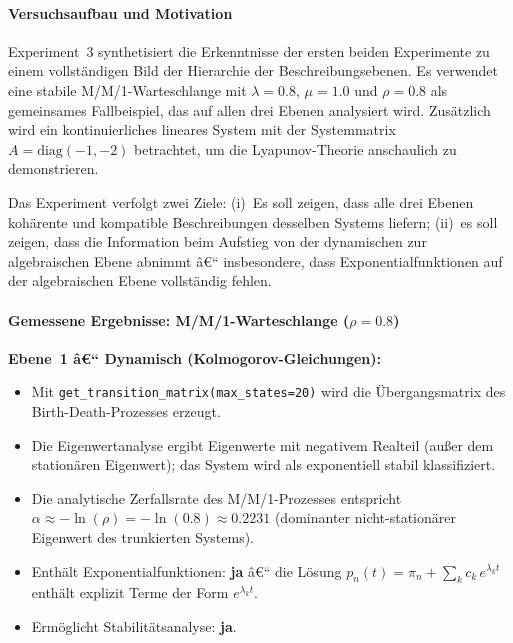 ﻿\documentclass[a4paper,12pt]{scrreprt}
\theoremstyle{definition}
\begin{document}
\paragraph{Versuchsaufbau und Motivation}

Experiment~3 synthetisiert die Erkenntnisse der ersten beiden
Experimente zu einem vollständigen Bild der Hierarchie der
Beschreibungsebenen.  Es verwendet eine stabile M/M/1-Warteschlange
mit $\lambda = 0.8$, $\mu = 1.0$ und $\rho = 0.8$ als gemeinsames
Fallbeispiel, das auf allen drei Ebenen analysiert wird.  Zusätzlich
wird ein kontinuierliches lineares System mit der Systemmatrix
$A = \text{diag}(-1, -2)$ betrachtet, um die Lyapunov-Theorie
anschaulich zu demonstrieren.

Das Experiment verfolgt zwei Ziele: (i)~Es soll zeigen, dass alle drei
Ebenen kohärente und kompatible Beschreibungen desselben Systems
liefern; (ii)~es soll zeigen, dass die Information beim Aufstieg von
der dynamischen zur algebraischen Ebene abnimmt â€“ insbesondere, dass
Exponentialfunktionen auf der algebraischen Ebene vollständig fehlen.

\paragraph{Gemessene Ergebnisse: M/M/1-Warteschlange ($\rho = 0.8$)}

\textbf{Ebene~1 â€“ Dynamisch (Kolmogorov-Gleichungen):}
\begin{itemize}
	\item Mit \texttt{get\_transition\_matrix(max\_states=20)} wird die Übergangsmatrix des Birth-Death-Prozesses erzeugt.
	\item Die Eigenwertanalyse ergibt Eigenwerte mit negativem Realteil
	(außer dem stationären Eigenwert); das System wird als
	exponentiell stabil klassifiziert.
	\item Die analytische Zerfallsrate des M/M/1-Prozesses entspricht
	$\alpha \approx -\ln(\rho) = -\ln(0.8) \approx 0.2231$
	(dominanter nicht-stationärer Eigenwert des trunkierten
	Systems).
	\item Enthält Exponentialfunktionen: \textbf{ja} â€“ die Lösung
	$p_n(t) = \pi_n + \sum_k c_k\,e^{\lambda_k t}$ enthält
	explizit Terme der Form $e^{\lambda_k t}$.
	\item Ermöglicht Stabilitätsanalyse: \textbf{ja}.
\end{itemize}
\end{document}
